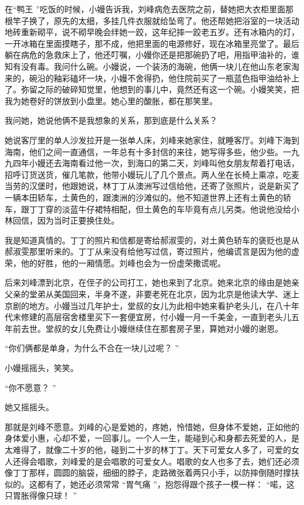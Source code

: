 \documentclass[12pt,twoside,openany]{book}
\begin{document}
在“鸭王 ”吃饭的时候，小嫚告诉我，刘峰病危去医院之前，替她把大衣柜里面那根竿子换了，原先的太细，多挂几件衣服就给坠弯了。他还帮她把浴室的一块活动地砖重新砌平，说不砌早晚会绊她一跤，这年纪摔一跤老五岁。还有冰箱内的灯，一开冰箱在里面摸瞎子，那不成，他把里面的电源修好，现在冰箱里亮堂了。最后躺在病危的急救床上了，他还叮嘱，小嫚你还是把那碗扔了吧，用指甲油补的，谁知有没有毒。我问什么碗。小嫚说，一个装汤的海碗，他俩一块儿在他山东老家淘来的，碗沿的釉彩磕坏一块，小嫚不舍得扔，他住院前买了一瓶蓝色指甲油给补上了。弥留之际的破碎知觉里，他想到的事儿中，竟然还有这一个碗。小嫚笑笑，把我为她卷好的饼放到小盘里。她心里的酸胀，都在那笑里。

我问她，她说他俩不是我想象的关系，那到底是什么关系？

她说客厅里的单人沙发拉开是一张单人床，刘峰来她家住，就睡客厅。刘峰下海到海南，他们之间一直通信，一年总有十多封信的来往，她写得多些，他少些。一九九四年小嫚还去海南看过他一次，到海口的第二天，刘峰叫他女朋友帮着打电话，招呼订货送货，催几笔款，他带小嫚玩儿了几个景点。两人坐在长椅上乘凉，吃麦当劳的汉堡时，他跟她说，林丁丁从澳洲写过信给他，还寄了张照片，说是新买了一辆本田轿车，土黄色的，跟澳洲的沙滩似的。他不知道世界上还有土黄色的轿车，跟丁丁穿的淡蓝牛仔裙特相配，但土黄色的车毕竟有点儿另类。他说他没给小林回信，因为当时正要换住处。

我是知道真情的。丁丁的照片和信都是寄给郝淑雯的，对土黄色轿车的褒贬也是从郝淑雯那里听来的。丁丁从来没有给他写过信，寄过照片，他编谎言是因为他的虚荣，他的好胜，他的一厢情愿。刘峰也会为一份虚荣撒谎呢。

后来刘峰漂到北京，在侄子的公司打工，她也来到了北京。她来北京的缘由是她亲父亲的堂弟从美国回来，半身不遂，非要老死在北京，因为北京是他读大学、迷上京剧的地方。小嫚当过几年护士，堂叔的女儿为此相中她来看护老头儿，在八十年代末修建的高层宿舍楼里买下一套便宜房，付小嫚一月一千美金，一直到老头儿五年前去世。堂叔的女儿免费让小嫚继续住在那套房子里，算她对小嫚的谢恩。

“你们俩都是单身，为什么不合在一块儿过呢？ ”

小嫚摇摇头，笑笑。

“你不愿意？ ”

她又摇摇头。

那就是刘峰不愿意。刘峰的心是爱她的，疼她，怜惜她，但身体不爱她，正如他的身体爱小惠，心却不爱，一回事儿。一个人一生，能碰到心和身都去死爱的人，是太难得了，就像二十岁的他，碰到二十岁的林丁丁。天下可爱女人多了，可爱的女人还得会唱歌，刘峰爱的是会唱歌的可爱女人。唱歌的女人也多了去，她们还必须像丁丁那样，圆圆的脑袋，细细的脖子，走路微张着两只小手，以防摔倒随时撑扶似的。这都有了，她还必须常常 “胃气痛 ”，抱怨得跟个孩子一模一样： “喏，这只胃胀得像只球！ ”
\end{document}
